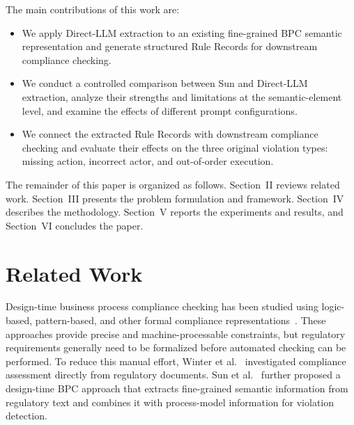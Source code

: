 \documentclass[conference]{IEEEtran}
\begin{document}
The main contributions of this work are:
\begin{itemize}
    \item We apply Direct-LLM extraction to an existing fine-grained BPC semantic representation and generate structured Rule Records for downstream compliance checking.

    \item We conduct a controlled comparison between Sun and Direct-LLM extraction, analyze their strengths and limitations at the semantic-element level, and examine the effects of different prompt configurations.

    \item We connect the extracted Rule Records with downstream compliance checking and evaluate their effects on the three original violation types: missing action, incorrect actor, and out-of-order execution.
\end{itemize}

The remainder of this paper is organized as follows. Section~II reviews related work. Section~III presents the problem formulation and framework. Section~IV describes the methodology. Section~V reports the experiments and results, and Section~VI concludes the paper.


\section{Related Work}
\label{sec:2}

Design-time business process compliance checking has been studied using logic-based, pattern-based, and other formal compliance representations~\cite{hashmi2018we,zasada2023evaluation}. These approaches provide precise and machine-processable constraints, but regulatory requirements generally need to be formalized before automated checking can be performed. To reduce this manual effort, Winter et al.~\cite{winter2020assessing} investigated compliance assessment directly from regulatory documents. Sun et al.~\cite{sun2024design} further proposed a design-time BPC approach that extracts fine-grained semantic information from regulatory text and combines it with process-model information for violation detection.
\end{document}

